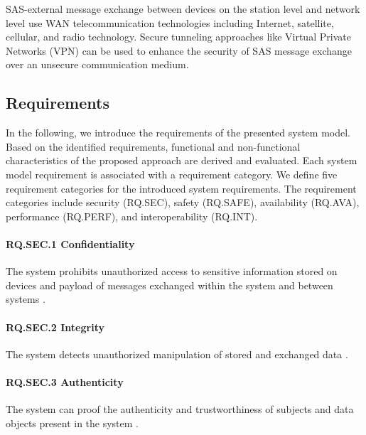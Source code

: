 SAS-external message exchange between devices on the station level and network level use WAN telecommunication technologies including Internet, satellite, cellular, and radio technology.
Secure tunneling approaches like Virtual Private Networks (VPN) can be used to enhance the security of SAS message exchange over an unsecure communication medium.


\subsection{Requirements}
In the following, we introduce the requirements of the presented system model.
Based on the identified requirements, functional and non-functional characteristics of the proposed approach are derived and evaluated.
Each system model requirement is associated with a requirement category.
We define five requirement categories for the introduced system requirements.
The requirement categories include security (RQ.SEC), safety (RQ.SAFE), availability (RQ.AVA), performance (RQ.PERF), and interoperability (RQ.INT).

\paragraph{RQ.SEC.1 Confidentiality}
The system prohibits unauthorized access to sensitive information stored on devices and payload of messages exchanged within the system and between systems \cite{Eckert2023}.
\paragraph{RQ.SEC.2 Integrity}
The system detects unauthorized manipulation of stored and exchanged data \cite{Eckert2023}.
\paragraph{RQ.SEC.3 Authenticity}
The system can proof the authenticity and trustworthiness of subjects and data objects present in the system \cite{Eckert2023}.
